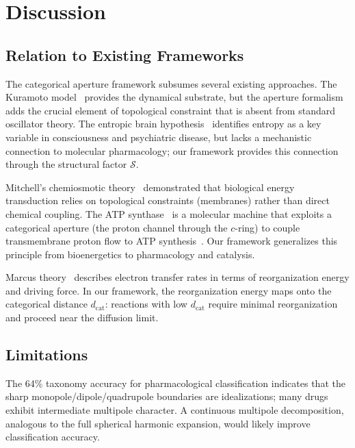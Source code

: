 \documentclass[10pt,twocolumn]{article}
\theoremstyle{definition}
\theoremstyle{remark}
\newcommand{\dcat}{d_{\mathrm{cat}}}
\begin{document}
\section{Discussion}\label{sec:discussion}

\subsection{Relation to Existing Frameworks}

The categorical aperture framework subsumes several existing
approaches.  The Kuramoto model~\cite{Kuramoto1984,Strogatz2000}
provides the dynamical substrate, but the aperture formalism
adds the crucial element of topological constraint that is absent
from standard oscillator theory.  The entropic brain
hypothesis~\cite{CarhartHarris2014} identifies entropy as a
key variable in consciousness and psychiatric disease, but lacks
a mechanistic connection to molecular pharmacology; our framework
provides this connection through the structural factor $\mathcal{S}$.

Mitchell's chemiosmotic theory~\cite{Mitchell1961} demonstrated
that biological energy transduction relies on topological
constraints (membranes) rather than direct chemical coupling.
The ATP synthase~\cite{Boyer1997} is a molecular machine that
exploits a categorical aperture (the proton channel through
the $c$-ring) to couple transmembrane proton flow to
ATP synthesis~\cite{Nicholls2013,Wikstrom2015}.
Our framework generalizes this principle from bioenergetics
to pharmacology and catalysis.

Marcus theory~\cite{Marcus1985} describes electron transfer
rates in terms of reorganization energy and driving force.
In our framework, the reorganization energy maps onto the
categorical distance $\dcat$: reactions with low $\dcat$
require minimal reorganization and proceed near the
diffusion limit.

\subsection{Limitations}

The 64\% taxonomy accuracy for pharmacological classification
indicates that the sharp monopole/dipole/quadrupole boundaries
are idealizations; many drugs exhibit intermediate multipole
character.  A continuous multipole decomposition, analogous to
the full spherical harmonic expansion, would likely improve
classification accuracy.
\end{document}
